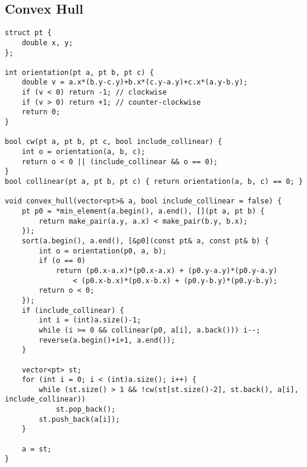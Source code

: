 \subsection{Convex Hull}
\begin{lstlisting}
struct pt {
    double x, y;
};

int orientation(pt a, pt b, pt c) {
    double v = a.x*(b.y-c.y)+b.x*(c.y-a.y)+c.x*(a.y-b.y);
    if (v < 0) return -1; // clockwise
    if (v > 0) return +1; // counter-clockwise
    return 0;
}

bool cw(pt a, pt b, pt c, bool include_collinear) {
    int o = orientation(a, b, c);
    return o < 0 || (include_collinear && o == 0);
}
bool collinear(pt a, pt b, pt c) { return orientation(a, b, c) == 0; }

void convex_hull(vector<pt>& a, bool include_collinear = false) {
    pt p0 = *min_element(a.begin(), a.end(), [](pt a, pt b) {
        return make_pair(a.y, a.x) < make_pair(b.y, b.x);
    });
    sort(a.begin(), a.end(), [&p0](const pt& a, const pt& b) {
        int o = orientation(p0, a, b);
        if (o == 0)
            return (p0.x-a.x)*(p0.x-a.x) + (p0.y-a.y)*(p0.y-a.y)
                < (p0.x-b.x)*(p0.x-b.x) + (p0.y-b.y)*(p0.y-b.y);
        return o < 0;
    });
    if (include_collinear) {
        int i = (int)a.size()-1;
        while (i >= 0 && collinear(p0, a[i], a.back())) i--;
        reverse(a.begin()+i+1, a.end());
    }

    vector<pt> st;
    for (int i = 0; i < (int)a.size(); i++) {
        while (st.size() > 1 && !cw(st[st.size()-2], st.back(), a[i], include_collinear))
            st.pop_back();
        st.push_back(a[i]);
    }

    a = st;
}
\end{lstlisting}